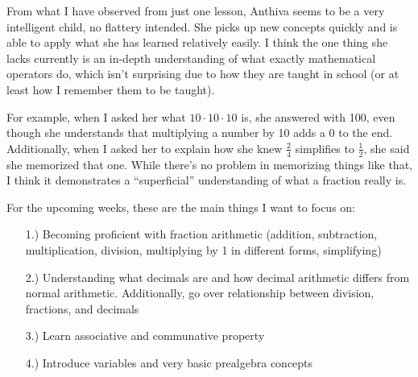 \documentclass[hidelinks]{article}
\begin{document}
From what I have observed from just one lesson, Anthiva seems to be a very intelligent child, no flattery intended. She picks up new concepts quickly and is able to apply what she has learned relatively easily. I think the one thing she lacks currently is an in-depth understanding of what exactly mathematical operators do, which isn't surprising due to how they are taught in school (or at least how I remember them to be taught). 
\vspace{0.2cm}

\noindent
For example, when I asked her what $10 \cdot 10 \cdot 10$ is, she answered with 100, even though she understands that multiplying a number by 10 adds a 0 to the end. Additionally, when I asked her to explain how she knew $\frac{2}{4}$ simplifies to $\frac{1}{2}$, she said she memorized that one. While there's no problem in memorizing things like that, I think it demonstrates a ``superficial'' understanding of what a fraction really is. 
\vspace{0.2cm}

\noindent
For the upcoming weeks, these are the main things I want to focus on: 
\begin{itemize}
    \item[1.)] Becoming proficient with fraction arithmetic (addition, subtraction, multiplication, division, multiplying by 1 in different forms, simplifying)
    \item[2.)] Understanding what decimals are and how decimal arithmetic differs from normal arithmetic. Additionally, go over relationship between division, fractions, and decimals
    \item[3.)] Learn associative and communative property 
    \item[4.)] Introduce variables and very basic prealgebra concepts 
\end{itemize}
\end{document}
